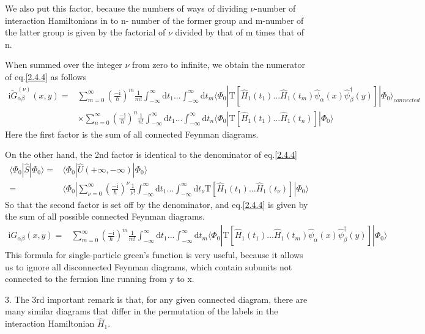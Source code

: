 We also put this factor, because the numbers of ways of dividing $\nu$-number of interaction Hamiltonians in to n- number of the former group and m-number of the latter group is given by the factorial of $\nu$ divided by that of m times that of n.

When summed over the integer $\nu$ from zero to infinite, we obtain the numerator of eq.\eqref{2.4.4} as follows
\begin{align}
\mathrm{i}\tilde{G}_{\alpha\beta}^{(\nu)}(x,y)=& \sum_{m=0}^{\infty}(\frac{-\mathrm{i}}{\hbar})^{m}\frac{1}{m!}\int_{-\infty}^{\infty}\mathrm{d}t_1...\int_{-\infty}^{\infty}\mathrm{d}t_{m}\langle\Phi_0|\mathrm{T}[\hat H_1(t_1)...\hat H_1(t_{m})\hat \psi_{\alpha}(x)\hat \psi^{\dagger}_{\beta}(y)]|\Phi_0\rangle_{connected} \nonumber \\
&\times\sum_{n=0}^{\infty}(\frac{-\mathrm{i}}{\hbar})^{n}\frac{1}{n!}\int_{-\infty}^{\infty}\mathrm{d}t_1...\int_{-\infty}^{\infty}\mathrm{d}t_{n}\langle\Phi_0|\mathrm{T}[\hat H_1(t_1)...\hat H_1(t_{n})]|\Phi_0\rangle\nonumber 
\end{align}
Here the first factor is the sum of all connected Feynman diagrams.

On the other hand, the 2nd factor is identical to the denominator of eq.\eqref{2.4.4}
\begin{align}
\langle\Phi_0|\hat{S}|\Phi_0\rangle=&\langle\Phi_0|\hat{U}(+\infty,-\infty)|\Phi_0\rangle \nonumber \\
=&\langle\Phi_0|\sum_{\nu=0}^{\infty}(\frac{-\mathrm{i}}{\hbar})^{\nu}\frac{1}{\nu!}\int_{-\infty}^{\infty}\mathrm{d}t_1...\int_{-\infty}^{\infty}\mathrm{d}t_{\nu}\mathrm{T}[\hat H_1(t_1)...\hat H_1(t_{\nu})]|\Phi_0\rangle\nonumber 
\end{align}
So that the second factor is set off by the denominator, and eq.\eqref{2.4.4} is given by the sum of all possible connected Feynman diagrams.
\begin{align} \label{2.5.3}
\mathrm{i}G_{\alpha\beta}(x,y)=& \sum_{m=0}^{\infty}(\frac{-\mathrm{i}}{\hbar})^{m}\frac{1}{m!}\int_{-\infty}^{\infty}\mathrm{d}t_1...\int_{-\infty}^{\infty}\mathrm{d}t_{m}\langle\Phi_0|\mathrm{T}[\hat H_1(t_1)...\hat H_1(t_{m})\hat \psi_{\alpha}(x)\hat \psi^{\dagger}_{\beta}(y)]|\Phi_0\rangle
\end{align}
This formula for single-particle green's function is very useful, because it allows us to ignore all disconnected Feynman diagrams, which contain subunits not connected to the fermion line running from y to x.

3. The 3rd important remark is that, for any given connected diagram, there are many similar diagrams that differ in the permutation of the labels in the interaction Hamiltonian $\hat H_1$.

